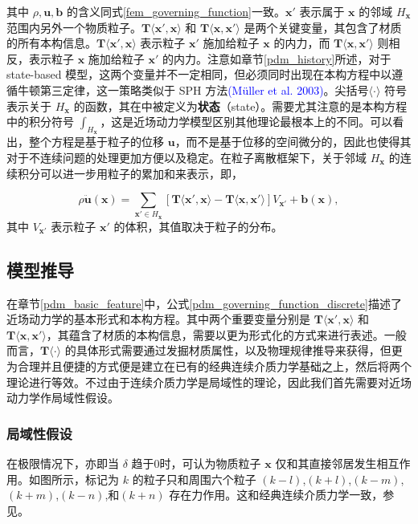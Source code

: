 其中 $\rho, \mathbf{u}, \mathbf{b}$ 的含义同式\ref{fem_governing_function}一致。$\mathbf{x}'$ 表示属于 $\mathbf{x}$ 的邻域 $H_\mathbf{x}$ 范围内另外一个物质粒子。$\mathbf{T}\langle\mathbf{x}',\mathbf{x}\rangle$ 和 $\mathbf{T}\langle\mathbf{x},\mathbf{x}'\rangle$ 是两个关键变量，其包含了材质的所有本构信息。$\mathbf{T}\langle\mathbf{x}',\mathbf{x}\rangle$ 表示粒子 $\mathbf{x}'$ 施加给粒子 $\mathbf{x}$ 的内力，而 $\mathbf{T}\langle\mathbf{x},\mathbf{x}'\rangle$ 则相反，表示粒子 $\mathbf{x}$ 施加给粒子 $\mathbf{x}'$ 的内力。注意如章节\ref{pdm_history}所述，对于 state-based 模型，这两个变量并不一定相同，但必须同时出现在本构方程中以遵循牛顿第三定律，这一策略类似于 SPH 方法\textcolor{blue}{(M\"{u}ller et al. 2003)\parencite{Muller2003}}。尖括号$\langle\cdot\rangle$ 符号表示关于 $H_\mathbf{x}$ 的函数，其在中被定义为\textbf{状态}（state）。需要尤其注意的是本构方程中的积分符号 $\int_{H_\mathbf{x}}$，这是近场动力学模型区别其他理论最根本上的不同。可以看出，整个方程是基于粒子的位移 $\mathbf{u}$，而不是基于位移的空间微分的，因此也使得其对于不连续问题的处理更加方便以及稳定。在粒子离散框架下，关于邻域 $H_\mathbf{x}$ 的连续积分可以进一步用粒子的累加和来表示，即，

\begin{equation}
\rho\ddot{\mathbf{u}}(\mathbf{x}) = \sum_{\mathbf{x}'\in H_\mathbf{x}}[\mathbf{T}\langle\mathbf{x}',\mathbf{x}\rangle - \mathbf{T}\langle\mathbf{x},\mathbf{x}'\rangle]V_{\mathbf{x}'}+\mathbf{b}(\mathbf{x}),
\label{pdm_governing_function_discrete}
\end{equation}
其中 $V_{\mathbf{x}'}$ 表示粒子 $\mathbf{x}'$ 的体积，其值取决于粒子的分布。

\subsection{模型推导}
\label{pdm_derivation}

在章节\ref{pdm_basic_feature}中，公式\ref{pdm_governing_function_discrete}描述了近场动力学的基本形式和本构方程。其中两个重要变量分别是 $\mathbf{T}\langle\mathbf{x}',\mathbf{x}\rangle$ 和 $\mathbf{T}\langle\mathbf{x},\mathbf{x}'\rangle$，其蕴含了材质的本构信息，需要以更为形式化的方式来进行表述。一般而言，$\mathbf{T}\langle\cdot\rangle$ 的具体形式需要通过发掘材质属性，以及物理规律推导来获得，但更为合理并且便捷的方式便是建立在已有的经典连续介质力学基础之上，然后将两个理论进行等效。不过由于连续介质力学是局域性的理论，因此我们首先需要对近场动力学作局域性假设。

\subsubsection{局域性假设}
在极限情况下，亦即当 $\delta$ 趋于0时，可认为物质粒子 $\mathbf{x}$ 仅和其直接邻居发生相互作用。如图所示，标记为 $k$ 的粒子只和周围六个粒子 $(k-l)$,$(k+l)$,$(k-m)$,$(k+m)$,$(k-n)$,和$(k+n)$ 存在力作用。这和经典连续介质力学一致，参见。

